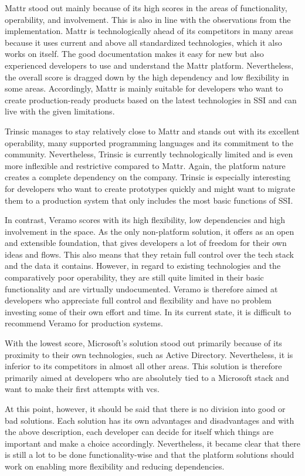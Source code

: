     
    Mattr stood out mainly because of its high scores in the areas of functionality, operability, and involvement. This is also in line with the observations from the implementation. Mattr is technologically ahead of its competitors in many areas because it uses current and above all standardized technologies, which it also works on itself. The good documentation makes it easy for new but also experienced developers to use and understand the Mattr platform. Nevertheless, the overall score is dragged down by the high dependency and low flexibility in some areas. Accordingly, Mattr is mainly suitable for developers who want to create production-ready products based on the latest technologies in \ac{SSI} and can live with the given limitations.

    Trinsic manages to stay relatively close to Mattr and stands out with its excellent operability, many supported programming languages and its commitment to the community. Nevertheless, Trinsic is currently technologically limited and is even more inflexible and restrictive compared to Mattr. Again, the platform nature creates a complete dependency on the company. Trinsic is especially interesting for developers who want to create prototypes quickly and might want to migrate them to a production system that only includes the most basic functions of \ac{SSI}.
    
    In contrast, Veramo scores with its high flexibility, low dependencies and high involvement in the space. As the only non-platform solution, it offers as an open and extensible foundation, that gives developers a lot of freedom for their own ideas and flows. This also means that they retain full control over the tech stack and the data it contains. However, in regard to existing technologies and the comparatively poor operability, they are still quite limited in their basic functionality and are virtually undocumented. Veramo is therefore aimed at developers who appreciate full control and flexibility and have no problem investing some of their own effort and time. In its current state, it is difficult to recommend Veramo for production systems.
    
    With the lowest score, Microsoft's solution stood out primarily because of its proximity to their own technologies, such as Active Directory. Nevertheless, it is inferior to its competitors in almost all other areas. This solution is therefore primarily aimed at developers who are absolutely tied to a Microsoft stack and want to make their first attempts with \acp{vc}.
    
    At this point, however, it should be said that there is no division into good or bad solutions. Each solution has its own advantages and disadvantages and with the above description, each developer can decide for itself which things are important and make a choice accordingly. Nevertheless, it became clear that there is still a lot to be done functionality-wise and that the platform solutions should work on enabling more flexibility and reducing dependencies. 
	
	
	
	